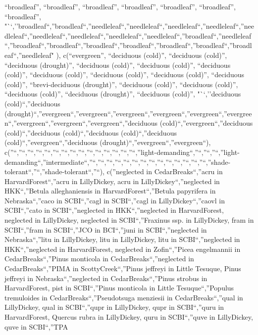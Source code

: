 \documentclass[
]{article}
\begin{document}
``broadleaf'', ``broadleaf'', ``broadleaf'', ``broadleaf'',
``broadleaf'', ``broadleaf'', ``broadleaf'',
"``,''broadleaf``,''broadleaf``,''needleleaf``,''needleleaf``,''needleleaf``,''needleleaf``,''needleleaf``,''needleleaf``,''needleleaf``,''needleleaf``,''needleleaf``,''broadleaf``,''needleleaf``,''broadleaf``,''broadleaf``,''broadleaf``,''broadleaf``,''broadleaf``,''broadleaf``,''broadleaf``,''needleleaf"
), c(``evergreen'', ``deciduous (cold)'', ``deciduous (cold)'',
``deciduous (drought)'', ``deciduous (cold)'', ``deciduous (cold)'',
``deciduous (cold)'', ``deciduous (cold)'', ``deciduous (cold)'',
``deciduous (cold)'', ``deciduous (cold)'', ``brevi-deciduous
(drought)'', ``deciduous (cold)'', ``deciduous (cold)'', ``deciduous
(cold)'', ``deciduous (drought)'', ``deciduous (cold)'', "``,''deciduous
(cold)``,''deciduous
(drought)``,''evergreen``,''evergreen``,''evergreen``,''evergreen``,''evergreen``,''evergreen``,''evergreen``,''evergreen``,''evergreen``,''deciduous
(cold)``,''evergreen``,''deciduous (cold)``,''deciduous
(cold)``,''deciduous (cold)``,''deciduous
(cold)``,''evergreen``,''deciduous
(drought)``,''evergreen``,''evergreen``),
c(''``,''``,''``,''``,''``,''``,''``,''``,''``,''``,''``,''``,''``,''``,''``,''light-demanding``,''``,''``,''``,''light-demanding``,''intermediate``,''``,''``,''``,''``,''``,''``,''``,''``,''``,''``,''``,''``,''``,''``,''shade-tolerant``,''``,''shade-tolerant``,''``),
c(''neglected in CedarBreaks``,''acru in HarvardForest``,''acru in
LillyDickey, acru in LillyDickey``,''neglected in HKK``,''Betula
alleghaniensis in HarvardForest``,''Betula papyrifera in
Nebraska``,''caco in SCBI``,''cagl in SCBI``,''cagl in
LillyDickey``,''caovl in SCBI``,''cato in SCBI``,''neglected in
HKK``,''neglected in HarvardForest, neglected in LillyDickey, neglected
in SCBI``,''Fraxinus ssp. in LillyDickey, fram in SCBI``,''fram in
SCBI``,''JCO in BCI``,''juni in SCBI``,''neglected in Nebraska``,''litu
in LillyDickey, litu in LillyDickey, litu in SCBI``,''neglected in
HKK``,''neglected in HarvardForest, neglected in Zofin``,''Picea
engelmannii in CedarBreaks``,''Pinus monticola in
CedarBreaks``,''neglected in CedarBreaks``,''PIMA in
ScottyCreek``,''Pinus jeffreyi in Little Tesuque, Pinus jeffreyi in
Nebraska``,''neglected in CedarBreaks``,''Pinus strobus in
HarvardForest, pist in SCBI``,''Pinus monticola in Little
Tesuque``,''Populus tremuloides in CedarBreaks``,''Pseudotsuga menziesii
in CedarBreaks``,''qual in LillyDickey, qual in SCBI``,''qupr in
LillyDickey, qupr in SCBI``,''quru in HarvardForest, Quercus rubra in
LillyDickey, quru in SCBI``,''quve in LillyDickey, quve in SCBI``,''TPA
\end{document}
